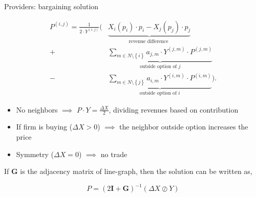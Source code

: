 \documentclass[xcolor={svgnames}]{beamer}
\newcommand{\matr}[1]{\bm{#1}}
\newcommand{\set}[1]{\left\{#1\right\}}
\begin{document}
\begin{frame}[allowframebreaks]{Providers: bargaining solution}



    \begin{equation*}
        \begin{split}
            P^{(i, j)} = \frac{1}{2\cdot Y^{(i, j)}} \Biggl( &\underbrace{X_i(p_i)\cdot p_i - X_j(p_j)\cdot p_j}_{\text{revenue difference }}
            \\  + &\underbrace{\sum_{m\in N\setminus \set{i}} a_{j, m} \cdot Y^{(j, m)} \cdot P^{(j, m)}}_{\text{outside option of } j}
            \\ - & \underbrace{\sum_{m \in N\setminus \set{j}} a_{i, m} \cdot Y^{(i, m)} \cdot P^{(i, m)}}_{\text{outside option of } i} \Biggr).
        \end{split}
    \end{equation*}

    \newpage

    \begin{itemize}\setlength\itemsep{1.5em}
        \item No neighbors $\implies$ $P \cdot Y = \frac{\Delta X}{2}$, dividing revenues based on contribution
        \item If firm is buying ($\Delta X > 0$) $\implies$  the neighbor outside option increases the price
        \item Symmetry ($\Delta X = 0$) $\implies$ no trade
    \end{itemize}

    If $\matr{G}$ is the adjacency matrix of line-graph, then the solution can be written as,

    \begin{equation*}
        P = (2\matr{I} + \matr{G})^{-1} (\Delta X \oslash Y)
    \end{equation*}

\end{frame}


\iffalse
    \begin{frame}[allowframebreaks]{Bibliography}
        \nocite{*}
        \printbibliography
    \end{frame}
\fi
\end{document}
